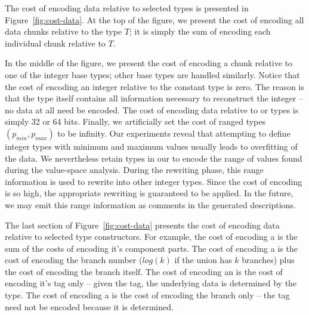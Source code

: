 The cost of encoding data relative to selected types is presented in 
Figure~\ref{fig:cost-data}.  At the top of the figure,
we present the cost of encoding all data
chunks relative to the type $T$; it is simply the sum of encoding
each individual chunk relative to $T$.  

In the middle of the figure,
we present the cost of encoding a chunk relative to one of the integer base 
types; other base types are handled similarly.  Notice that the cost of 
encoding an integer relative to the constant type  is
zero.  The reason is that the type itself contains all information
necessary to reconstruct the integer -- no data at all need be encoded.
The cost of encoding data relative to  or  types 
is simply 32 or 64 bits.  Finally, we artificially set the cost of
ranged types $(p_{min},p_{max})$ to be infinity.
Our experiments reveal that attempting to define integer types with
minimum and maximum values usually leads to overfitting of the data.
We nevertheless retain  types in our \ir{} to encode
the range of values found during the value-space analysis.  During the
rewriting phase, this range information is used to rewrite 
into other integer types.  Since the
cost of encoding  is so high, the appropriate rewriting is 
guaranteed to be applied.  In the future, we may emit this range information
as comments in the generated descriptions.

The last section of Figure~\ref{fig:cost-data} presents the cost of
encoding data relative to selected type constructors.  For example,
the cost of encoding a  is the sum of the costs of encoding
it's component parts.  The cost of encoding a  is the cost
of encoding the branch number ($log(k)$ if the union has $k$ branches)
plus the cost of encoding the branch itself.  The cost of encoding
an  is the cost of encoding it's tag only -- given the tag,
the underlying data is determined by the type.  The cost of encoding
a  is the cost of encoding the branch only -- the tag need not
be encoded because it is determined.

